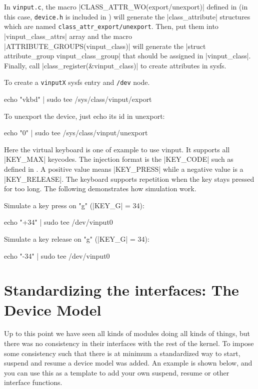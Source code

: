 \documentclass[10pt, oneside]{book}
\begin{document}
In \verb|vinput.c|, the macro \cpp|CLASS_ATTR_WO(export/unexport)| defined in  (in this case, \verb|device.h| is included in ) will generate the \cpp|class_attribute| structures which are named \verb|class_attr_export/unexport|.
Then, put them into \cpp|vinput_class_attrs| array and the macro \cpp|ATTRIBUTE_GROUPS(vinput_class)| will generate the \cpp|struct attribute_group vinput_class_group| that should be assigned in \cpp|vinput_class|.
Finally, call \cpp|class_register(&vinput_class)| to create attributes in sysfs.

To create a \verb|vinputX| sysfs entry and \verb|/dev| node.

\begin{codebash}
echo "vkbd" | sudo tee /sys/class/vinput/export
\end{codebash}

To unexport the device, just echo its id in unexport:

\begin{codebash}
echo "0" | sudo tee /sys/class/vinput/unexport
\end{codebash}


Here the virtual keyboard is one of example to use vinput.
It supports all \cpp|KEY_MAX| keycodes.
The injection format is the \cpp|KEY_CODE| such as defined in .
A positive value means \cpp|KEY_PRESS| while a negative value is a \cpp|KEY_RELEASE|.
The keyboard supports repetition when the key stays pressed for too long.
The following demonstrates how simulation work.

Simulate a key press on "g" (\cpp|KEY_G| = 34):

\begin{codebash}
echo "+34" | sudo tee /dev/vinput0
\end{codebash}

Simulate a key release on "g" (\cpp|KEY_G| = 34):

\begin{codebash}
echo "-34" | sudo tee /dev/vinput0
\end{codebash}



\section{Standardizing the interfaces: The Device Model}
\label{sec:device_model}
Up to this point we have seen all kinds of modules doing all kinds of things, but there was no consistency in their interfaces with the rest of the kernel.
To impose some consistency such that there is at minimum a standardized way to start, suspend and resume a device model was added.
An example is shown below, and you can use this as a template to add your own suspend, resume or other interface functions.
\end{document}
